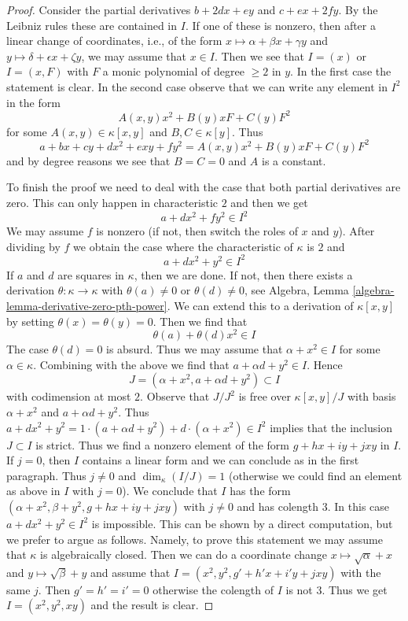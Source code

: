 \begin{proof}
Consider the partial derivatives $b + 2dx + ey$ and
$c + ex + 2fy$. By the Leibniz rules these are contained in $I$.
If one of these is nonzero, then after a linear change of coordinates,
i.e., of the form $x \mapsto \alpha + \beta x + \gamma y$ and
$y \mapsto \delta + \epsilon x + \zeta y$, we may assume
that $x \in I$. Then we see that $I = (x)$ or $I = (x, F)$ with
$F$ a monic polynomial of degree $\geq 2$ in $y$.
In the first case the statement is clear. In the second case
observe that we can write any element in $I^2$ in the form
$$
A(x, y) x^2 + B(y) x F + C(y) F^2
$$
for some $A(x, y) \in \kappa[x, y]$ and $B, C \in \kappa[y]$.
Thus
$$
a + b x + c y + d x^2 + exy + f y^2 = A(x, y) x^2 + B(y) x F + C(y) F^2
$$
and by degree reasons we see that $B = C = 0$ and $A$ is a constant.

\medskip\noindent
To finish the proof we need to deal with the case that both
partial derivatives are zero. This can only happen in characteristic $2$
and then we get
$$
a + d x^2 + f y^2 \in I^2
$$
We may assume $f$ is nonzero (if not, then switch the roles of $x$ and $y$).
After dividing by $f$ we obtain the case where the characteristic of
$\kappa$ is $2$ and
$$
a + d x^2 + y^2 \in I^2
$$
If $a$ and $d$ are squares in $\kappa$, then we are done. If not,
then there exists a derivation $\theta : \kappa \to \kappa$ with
$\theta(a) \not = 0$ or $\theta(d) \not = 0$, see
Algebra, Lemma \ref{algebra-lemma-derivative-zero-pth-power}.
We can extend this to a derivation of $\kappa[x, y]$ by setting
$\theta(x) = \theta(y) = 0$. Then we find that
$$
\theta(a) + \theta(d) x^2 \in I
$$
The case $\theta(d) = 0$ is absurd. Thus we may assume
that $\alpha + x^2 \in I$ for some $\alpha \in \kappa$.
Combining with the above we find that $a + \alpha d + y^2 \in I$.
Hence
$$
J = (\alpha + x^2, a + \alpha d + y^2) \subset I
$$
with codimension at most $2$. Observe that
$J/J^2$ is free over $\kappa[x, y]/J$ with basis
$\alpha + x^2$ and $a + \alpha d + y^2$.
Thus $a + d x^2 + y^2 =
1 \cdot (a + \alpha d + y^2) + d \cdot (\alpha + x^2) \in I^2$
implies that the inclusion $J \subset I$ is strict.
Thus we find a nonzero element of the form $g + hx + iy + jxy$ in $I$.
If $j = 0$, then $I$ contains a linear form and we can
conclude as in the first paragraph. Thus $j \not = 0$
and $\dim_\kappa(I/J) = 1$ (otherwise we could find
an element as above in $I$ with $j = 0$).
We conclude that $I$ has the form
$(\alpha + x^2, \beta + y^2, g + hx + iy + jxy)$
with $j \not = 0$ and has colength $3$.
In this case $a + dx^2 + y^2 \in I^2$ is impossible.
This can be shown by a direct computation, but we prefer to argue
as follows. Namely, to prove this statement we may assume that
$\kappa$ is algebraically closed. Then we can do a coordinate
change $x \mapsto \sqrt{\alpha} + x$ and $y \mapsto \sqrt{\beta} + y$
and assume that $I = (x^2, y^2, g' + h'x + i'y + jxy)$ with the same $j$.
Then $g' = h' = i' = 0$ otherwise the colength of $I$ is not $3$.
Thus we get $I = (x^2, y^2, xy)$ and the result is clear.
\end{proof}

